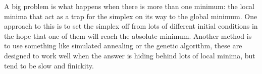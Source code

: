 \documentclass[11pt,a4paper]{scrartcl}
\begin{document}
A big problem is what happens when there is more than one minimum: the
local minima that act as a trap for the simplex on its way to the
global minimum. One approach to this is to set the simplex off from
lots of different initial conditions in the hope that one of them will
reach the absolute minimum. Another method is to use something like
simulated annealing or the genetic algorithm, these are designed to
work well when the answer is hiding behind lots of local minima, but
tend to be slow and finickity.
\end{document}
